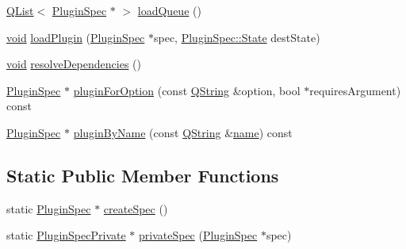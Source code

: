\begin{DoxyCompactItemize}
\item 
\hyperlink{class_q_list}{Q\-List}$<$ \hyperlink{class_extension_system_1_1_plugin_spec}{Plugin\-Spec} $\ast$ $>$ \hyperlink{class_extension_system_1_1_internal_1_1_plugin_manager_private_a9317db01cb0daa7ca5c3d2629af8c2b3}{load\-Queue} ()
\item 
\hyperlink{group___u_a_v_objects_plugin_ga444cf2ff3f0ecbe028adce838d373f5c}{void} \hyperlink{class_extension_system_1_1_internal_1_1_plugin_manager_private_a9da5a8705edf11abe810d001af6af5e6}{load\-Plugin} (\hyperlink{class_extension_system_1_1_plugin_spec}{Plugin\-Spec} $\ast$spec, \hyperlink{class_extension_system_1_1_plugin_spec_a3d40e1bd1f17eb32b314bcd282b3e3b9}{Plugin\-Spec\-::\-State} dest\-State)
\item 
\hyperlink{group___u_a_v_objects_plugin_ga444cf2ff3f0ecbe028adce838d373f5c}{void} \hyperlink{class_extension_system_1_1_internal_1_1_plugin_manager_private_aeafdcf8c4ecb2d7311ce9d2e9246e664}{resolve\-Dependencies} ()
\item 
\hyperlink{class_extension_system_1_1_plugin_spec}{Plugin\-Spec} $\ast$ \hyperlink{class_extension_system_1_1_internal_1_1_plugin_manager_private_aed5d2239cf54d612a3e668de2538fdf0}{plugin\-For\-Option} (const \hyperlink{group___u_a_v_objects_plugin_gab9d252f49c333c94a72f97ce3105a32d}{Q\-String} \&option, bool $\ast$requires\-Argument) const 
\item 
\hyperlink{class_extension_system_1_1_plugin_spec}{Plugin\-Spec} $\ast$ \hyperlink{class_extension_system_1_1_internal_1_1_plugin_manager_private_a30a333d4d21ef402dbaca5f3142ac666}{plugin\-By\-Name} (const \hyperlink{group___u_a_v_objects_plugin_gab9d252f49c333c94a72f97ce3105a32d}{Q\-String} \&\hyperlink{glext_8h_ad977737dfc9a274a62741b9500c49a32}{name}) const 
\end{DoxyCompactItemize}
\subsection*{Static Public Member Functions}
\begin{DoxyCompactItemize}
\item 
static \hyperlink{class_extension_system_1_1_plugin_spec}{Plugin\-Spec} $\ast$ \hyperlink{class_extension_system_1_1_internal_1_1_plugin_manager_private_a3776fd72434a1cb33fe10b1e92e2d0f7}{create\-Spec} ()
\item 
static \hyperlink{class_extension_system_1_1_internal_1_1_plugin_spec_private}{Plugin\-Spec\-Private} $\ast$ \hyperlink{class_extension_system_1_1_internal_1_1_plugin_manager_private_af14a993bfe1543afed5de3bec610d1bc}{private\-Spec} (\hyperlink{class_extension_system_1_1_plugin_spec}{Plugin\-Spec} $\ast$spec)
\end{DoxyCompactItemize}
